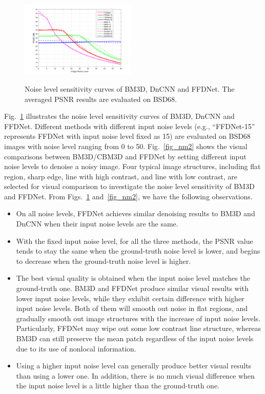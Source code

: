 \documentclass[journal]{IEEEtran}
\begin{document}
\begin{figure}[!bp]
\begin{center}
\subfigure
{\includegraphics[width=0.49\textwidth]{mismatch.pdf}}
\caption{Noise level sensitivity curves of BM3D, DnCNN and FFDNet. The averaged PSNR results are evaluated on BSD68.}\label{fig_nm1}
\end{center}%
\end{figure}

Fig.~\ref{fig_nm1} illustrates the noise level sensitivity curves of BM3D, DnCNN and FFDNet. Different methods with different input noise levels (e.g., ``FFDNet-15'' represents FFDNet with input noise level fixed as 15) are evaluated on BSD68 images with noise level ranging from 0 to 50.
Fig.~\ref{fig_nm2} shows the visual comparisons between BM3D/CBM3D and FFDNet by setting different input noise levels to denoise a noisy image. Four typical image structures, including flat region, sharp edge, line with high contrast, and line with low contrast, are selected for visual comparison to investigate the noise level sensitivity of BM3D and FFDNet.
From Figs.~\ref{fig_nm1} and~\ref{fig_nm2}, we have the following observations.
\begin{itemize}
   \item On all noise levels, FFDNet achieves similar denoising results to BM3D and DnCNN when their input noise levels are the same.

   \item With the fixed input noise level, for all the three methods, the PSNR value tends to stay the same when the ground-truth noise level is lower, and begins to decrease when the ground-truth noise level is higher.

   \item The best visual quality is obtained when the input noise level matches the ground-truth one. BM3D and FFDNet produce similar visual results with lower input noise levels, while they exhibit certain difference with higher input noise levels. Both of them will smooth out noise in flat regions, and gradually smooth out image structures with the increase of input noise levels. Particularly, FFDNet may wipe out some low contrast line structure, whereas BM3D can still preserve the mean patch regardless of the input noise levels due to its use of nonlocal information.

   \item Using a higher input noise level can generally produce better visual results than using a lower one. In addition, there is no much visual difference when the input noise level is a little higher than the ground-truth one.
\end{itemize}
\end{document}
